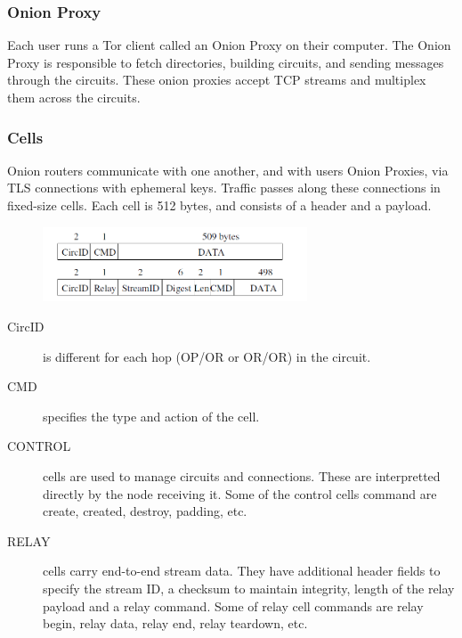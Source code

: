 \documentclass{main}
\begin{document}
\subsubsection{Onion Proxy}
Each user runs a Tor client called an Onion Proxy on their computer. 
The Onion Proxy is responsible to fetch directories, building circuits, and sending messages through the circuits. 
These onion proxies accept TCP streams and multiplex them across the circuits.

\subsubsection{Cells}

Onion routers communicate with one another, and with users Onion Proxies, via TLS connections with ephemeral keys. 
Traffic passes along these connections in fixed-size cells.
Each cell is 512 bytes, and consists of a header and a payload.

\begin{figure}[h]
	\centering
	\includegraphics[width=0.7\textwidth]{Resources/images/tor_cell.png}
\end{figure}

\begin{description}
    \item [CircID] is different for each hop (OP/OR or OR/OR) in the circuit.
    \item [CMD] specifies the type and action of the cell.

    \item [CONTROL] cells are used to manage circuits and connections. These are interpretted directly by the node receiving it. Some of the control cells command are create, created, destroy, padding, etc.
    \item [RELAY] cells carry end-to-end stream data. They have additional header fields to specify the stream ID, a checksum to maintain integrity, length of the relay payload and a relay command. Some of relay cell commands are relay begin, relay data, relay end, relay teardown, etc.
\end{description}
        
\end{document}
